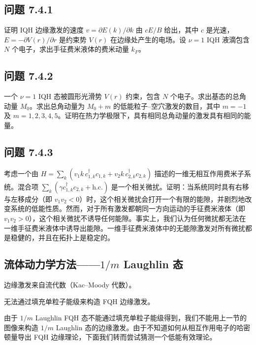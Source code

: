 
\subsection*{问题 7.4.1}
证明 IQH 边缘激发的速度 $v=\partial E(k)/\partial k$ 由 $cE/B$ 给出，其中 $c$ 是光速，$E=-\partial V(r)/\partial r$ 是约束势 $V(r)$ 在边缘处产生的电场。设 $\nu=1$ IQH 液滴包含 $N$ 个电子，求出手征费米液体的费米动量 $k_{F}$。

\subsection*{问题 7.4.2}
一个 $\nu=1$ IQH 态被圆形光滑势 $V(r)$ 约束，包含 $N$ 个电子。求出基态的总角动量 $M_{0}$。求出总角动量为 $M_{0}+m$ 的低能粒子--空穴激发的数目，其中 $m=-1$ 及 $m=1,2,3,4,5$。证明在热力学极限下，具有相同总角动量的激发具有相同的能量。

\subsection*{问题 7.4.3}
考虑一个由 $H=\sum_{k}(v_{1}k\,c_{1,k}^{\dagger}c_{1,k}+v_{2}k\,c_{2,k}^{\dagger}c_{2,k})$ 描述的一维无相互作用费米子系统。混合项 $\sum_{k}(\gamma c_{1,k}^{\dagger}c_{2,k}+\text{h.c.})$ 是一个相关微扰。证明：当系统同时具有右移与左移成分（即 $v_{1}v_{2}<0$）时，这个相关微扰会打开一个有限的能隙，并剧烈地改变系统的低能性质。然而，对于所有激发都朝同一方向运动的手征费米液体（即 $v_{1}v_{2}>0$），这个相关微扰不诱导任何能隙。事实上，我们认为任何微扰都无法在一维手征费米液体中诱导出能隙。一维手征费米液体中的无能隙激发对所有微扰都是稳健的，并且在拓扑上是稳定的。

\subsection{流体动力学方法——$1/m$ Laughlin 态}

\begin{keypoints}
\item 边缘激发来自流代数（Kac--Moody 代数）。
\item 无法通过填充单粒子能级来构造 FQH 边缘激发。
\end{keypoints}

由于 $1/m$ Laughlin FQH 态不能通过填充单粒子能级得到，我们不能用上一节的图像来构造 $1/m$ Laughlin 态的边缘激发。由于不知道如何从相互作用电子的哈密顿量导出 FQH 边缘理论，下面我们转而尝试猜测一个低能有效理论。

